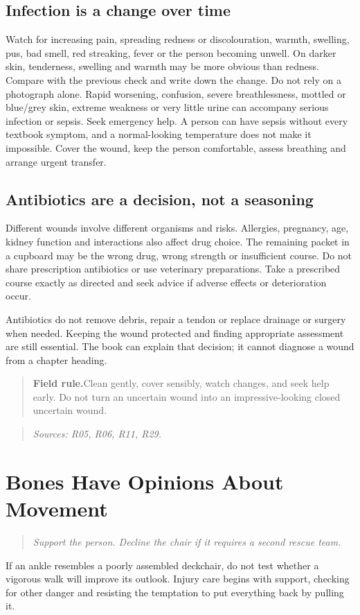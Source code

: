 \documentclass[10pt,openright]{book}
\newcommand{\fieldrule}[1]{\begin{quote}\textbf{Field rule.}\enspace #1\end{quote}}
\begin{document}
\section*{Infection is a change over time}
Watch for increasing pain, spreading redness or discolouration, warmth, swelling, pus, bad smell, red streaking, fever or the person becoming unwell. On darker skin, tenderness, swelling and warmth may be more obvious than redness. Compare with the previous check and write down the change. Do not rely on a photograph alone. Rapid worsening, confusion, severe breathlessness, mottled or blue/grey skin, extreme weakness or very little urine can accompany serious infection or sepsis. Seek emergency help. A person can have sepsis without every textbook symptom, and a normal-looking temperature does not make it impossible. Cover the wound, keep the person comfortable, assess breathing and arrange urgent transfer.

\section*{Antibiotics are a decision, not a seasoning}
Different wounds involve different organisms and risks. Allergies, pregnancy, age, kidney function and interactions also affect drug choice. The remaining packet in a cupboard may be the wrong drug, wrong strength or insufficient course. Do not share prescription antibiotics or use veterinary preparations. Take a prescribed course exactly as directed and seek advice if adverse effects or deterioration occur.

Antibiotics do not remove debris, repair a tendon or replace drainage or surgery when needed. Keeping the wound protected and finding appropriate assessment are still essential. The book can explain that decision; it cannot diagnose a wound from a chapter heading.

\fieldrule{Clean gently, cover sensibly, watch changes, and seek help early. Do not turn an uncertain wound into an impressive-looking closed uncertain wound.}
\begin{quote}\emph{Sources: R05, R06, R11, R29.}\end{quote}
\chapter{Bones Have Opinions About Movement}
\begin{quote}\emph{Support the person. Decline the chair if it requires a second rescue team.}\end{quote}
If an ankle resembles a poorly assembled deckchair, do not test whether a vigorous walk will improve its outlook. Injury care begins with support, checking for other danger and resisting the temptation to put everything back by pulling it.
\end{document}
